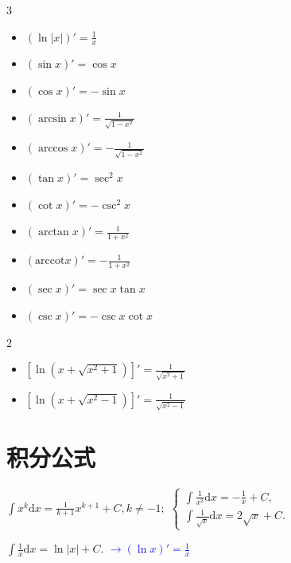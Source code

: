 \documentclass[lang=cn,math=mtpro2,10pt,scheme=chinese,black]{elegantbook}
\begin{document}
\begin{multicols}{3}
\begin{itemize}
    \item \( \displaystyle (\ln|x|)' = \frac{1}{x} \)
    \item \( \displaystyle ( \sin x )' = \cos x \)
    \item \( \displaystyle ( \cos x )' = -\sin x \)
    \item \( \displaystyle ( \arcsin x )' = \frac{1}{\sqrt{1-x^2}} \)
    \item \( \displaystyle ( \arccos x )' = -\frac{1}{\sqrt{1-x^2}} \)
    \item \( \displaystyle ( \tan x )' = \sec^2 x \)
    \item \( \displaystyle ( \cot x )' = -\csc^2 x \)
    \item \( \displaystyle ( \arctan x )' = \frac{1}{1+x^2} \)
    \item \( \displaystyle ( \text{arccot} x )' = -\frac{1}{1+x^2} \)
    \item \( \displaystyle ( \sec x )' = \sec x \tan x \)
    \item \( \displaystyle ( \csc x )' = -\csc x \cot x \)
\end{itemize}
\end{multicols}
\begin{multicols}{2}
\begin{itemize}
    \item \( \displaystyle \left[ \ln\left(x + \sqrt{x^2 + 1}\right) \right]' = \frac{1}{\sqrt{x^2 + 1}} \)
    \item \( \displaystyle \left[ \ln\left(x + \sqrt{x^2 - 1}\right) \right]' = \frac{1}{\sqrt{x^2 - 1}} \)
\end{itemize}
\end{multicols}

\section{积分公式}

$\displaystyle \int x^k \mathrm{d}x = \frac{1}{k+1} x^{k+1} + C, k \neq -1;$
$\begin{cases}
    \displaystyle \int \frac{1}{x^2} \mathrm{d}x = -\frac{1}{x} + C, \\
    \displaystyle \int \frac{1}{\sqrt{x}} \mathrm{d}x = 2\sqrt{x} + C.
\end{cases}$

\vspace{1em}
$\displaystyle \int \frac{1}{x} \mathrm{d}x = \ln|x| + C$. \quad \textcolor{blue}{$\to (\ln x)' = \frac{1}{x}$}
\end{document}
